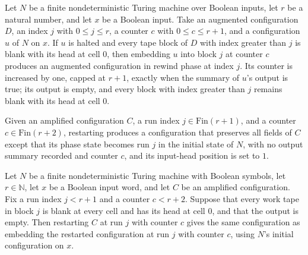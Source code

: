 \begin{theorem}
\label{Randomized.Amplify.rewindAt_emb}
\leanok
{}
Let $N$ be a finite nondeterministic Turing machine over Boolean inputs, let $r$ be a
natural number, and let $x$ be a Boolean input. Take an augmented configuration $D$, an
index $j$ with $0\le j\le r$, a counter $c$ with $0\le c\le r+1$, and a configuration
$u$ of $N$ on $x$. If $u$ is halted and every tape block of $D$ with index greater than
$j$ is blank with its head at cell $0$, then embedding $u$ into block $j$ at counter $c$
produces an augmented configuration in rewind phase at index $j$. Its counter is
increased by one, capped at $r+1$, exactly when the summary of $u$'s output is true; its
output is empty, and every block with index greater than $j$ remains blank with its head
at cell $0$.
\end{theorem}

\begin{definition}
\label{Randomized.Amplify.restart}
\leanok
{}
Given an amplified configuration $C$, a run index $j\in\text{Fin}(r+1)$, and a counter
$c\in\text{Fin}(r+2)$, restarting produces a configuration that preserves all fields of
$C$ except that its phase state becomes run $j$ in the initial state of $N$, with no
output summary recorded and counter $c$, and its input-head position is set to $1$.
\end{definition}

\begin{theorem}
\label{Randomized.Amplify.restart_eq_emb}
\leanok
{}
Let $N$ be a finite nondeterministic Turing machine with Boolean symbols, let
$r\in\mathbb{N}$, let $x$ be a Boolean input word, and let $C$ be an amplified
configuration. Fix a run index $j<r+1$ and a counter $c<r+2$. Suppose that every work
tape in block $j$ is blank at every cell and has its head at cell $0$, and that the
output is empty. Then restarting $C$ at run $j$ with counter $c$ gives the same
configuration as embedding the restarted configuration at run $j$ with counter $c$,
using $N$'s initial configuration on $x$.
\end{theorem}

